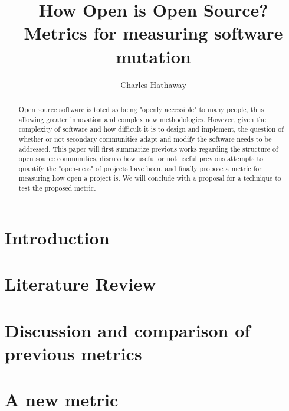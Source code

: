 \documentclass[]{article}
\title{How Open is Open Source? Metrics for measuring software mutation}
\author{Charles Hathaway}
\begin{document}
\maketitle

\begin{abstract}

Open source software is toted as being "openly accessible" to many people, thus allowing greater innovation and complex new methodologies.
However, given the complexity of software and how difficult it is to design and implement, the question of whether or not secondary communities adapt and modify the software needs to be addressed.
This paper will first summarize previous works regarding the structure of open source communities, discuss how useful or not useful previous attempts to quantify the "open-ness" of projects have been, and finally propose a metric for measuring how open a project is.
We will conclude with a proposal for a technique to test the proposed metric.

\end{abstract}

\section{Introduction}


\section{Literature Review}




\section{Discussion and comparison of previous metrics}

\section{A new metric}
\end{document}

